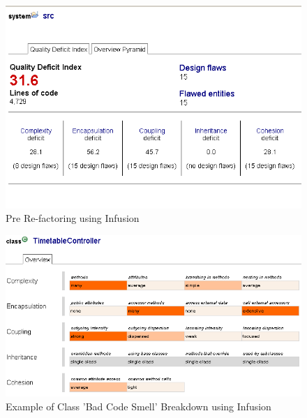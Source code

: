 \begin{figure}[H]
\begin{center}
\includegraphics[scale=0.7]{infusion1.PNG}
\end{center}
\caption{Pre Re-factoring using Infusion}
\end{figure}

\begin{figure} [H]
\begin{center}
\includegraphics[scale=0.7]{infusion3.PNG}
\caption{Example of Class 'Bad Code Smell' Breakdown using Infusion}
\end{center}
\end{figure}


